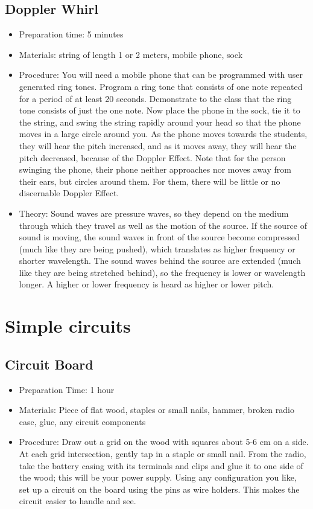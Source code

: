 \subsection{Doppler Whirl}
\begin{itemize}
\item{Preparation time: 5 minutes}
\item{Materials: string of length 1 or 2 meters, mobile phone, sock}
\item{Procedure: You will need a mobile phone that can be programmed with user generated ring tones. Program a ring tone that consists of one note repeated for a period of at least 20 seconds. Demonstrate to the class that the ring tone consists of just the one note. Now place the phone in the sock, tie it to the string, and swing the string rapidly around your head so that the phone moves in a large circle around you. As the phone moves towards the students, they will hear the pitch increased, and as it moves away, they will hear the pitch decreased, because of the Doppler Effect. Note that for the person swinging the phone, their phone neither approaches nor moves away from their ears, but circles around them. For them, there will be little or no discernable Doppler Effect.}
\item{Theory: Sound waves are pressure waves, so they depend on the medium through which they travel as well as the motion of the source. If the source of sound is moving, the sound waves in front of the source become compressed (much like they are being pushed), which translates as higher frequency or shorter wavelength. The sound waves behind the source are extended (much like they are being stretched behind), so the frequency is lower or wavelength longer. A higher or lower frequency is heard as higher or lower pitch.}
\end{itemize}

\section{Simple circuits}

\subsection{Circuit Board}
\begin{itemize}
\item{Preparation Time: 1 hour}
\item{Materials: Piece of flat wood, staples or small nails, hammer, broken radio case, glue, any circuit components}
\item{Procedure: Draw out a grid on the wood with squares about 5-6 cm on a side. At each grid intersection, gently tap in a staple or small nail. From the radio, take the battery casing with its terminals and clips and glue it to one side of the wood; this will be your power supply. Using any configuration you like, set up a circuit on the board using the pins as wire holders. This makes the circuit easier to handle and see.}
\end{itemize}

